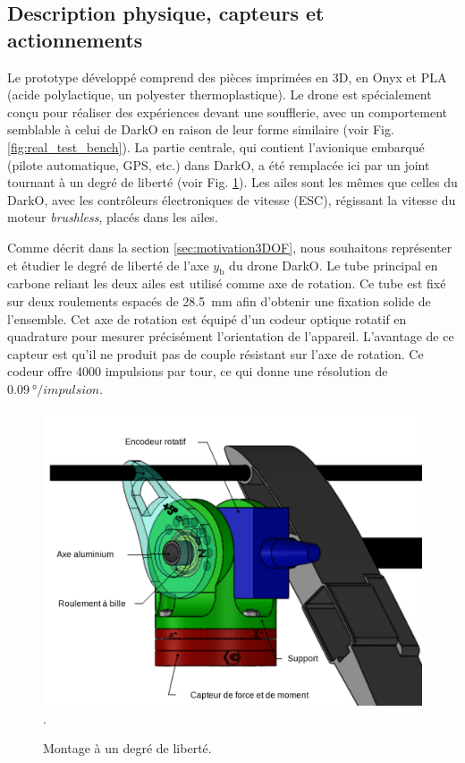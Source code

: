 \subsection{Description physique, capteurs et actionnements}
Le prototype développé comprend des pièces imprimées en 3D, en Onyx et PLA   (acide polylactique, un polyester thermoplastique). Le drone est spécialement conçu pour réaliser des expériences devant une soufflerie, avec un comportement semblable à celui de DarkO en raison de leur forme similaire (voir Fig. \ref{fig:real_test_bench}). La partie centrale, qui contient l'avionique embarqué (pilote automatique, GPS, etc.) dans DarkO, a été remplacée ici par un joint tournant à un degré de liberté (voir Fig. \ref{fig:rotation}). Les ailes sont les mêmes que celles du DarkO, avec les contrôleurs électroniques de vitesse (ESC), régissant la vitesse du moteur \textit{brushless}, placés dans les ailes.

Comme décrit dans la section \ref{sec:motivation3DOF}, nous souhaitons représenter et étudier le degré de liberté de l'axe $y_{\text{b}}$ du drone DarkO. Le tube principal en carbone reliant les deux ailes est utilisé comme axe de rotation. Ce tube est fixé sur deux roulements espacés de \SI{28.5}{\milli\meter} afin d'obtenir une fixation solide de l'ensemble. Cet axe de rotation est équipé d'un codeur optique rotatif en quadrature pour mesurer précisément l'orientation de l'appareil. L'avantage de ce capteur est qu'il ne produit pas de couple résistant sur l'axe de rotation. Ce codeur offre 4000 impulsions par tour, ce qui donne une résolution de $\SI{0.09}{\degree}/impulsion$.
\begin{figure}[!ht]
    \centering
    \includegraphics[width=0.6\columnwidth]{figures/MontageSupport2.png}.
    \caption{Montage à un degré de liberté.}
    \label{fig:rotation}
\end{figure} 

